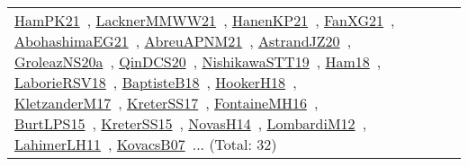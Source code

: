 {\begin{longtable}{lp{3cm}>{\raggedright\arraybackslash}p{6cm}>{\raggedright\arraybackslash}p{6cm}>{\raggedright\arraybackslash}p{8cm}}
\href{works/HamPK21.pdf}{HamPK21}~\cite{HamPK21}, \href{works/LacknerMMWW21.pdf}{LacknerMMWW21}~\cite{LacknerMMWW21}, \href{works/HanenKP21.pdf}{HanenKP21}~\cite{HanenKP21}, \href{works/FanXG21.pdf}{FanXG21}~\cite{FanXG21}, \href{works/AbohashimaEG21.pdf}{AbohashimaEG21}~\cite{AbohashimaEG21}, \href{works/AbreuAPNM21.pdf}{AbreuAPNM21}~\cite{AbreuAPNM21}, \href{works/AstrandJZ20.pdf}{AstrandJZ20}~\cite{AstrandJZ20}, \href{works/GroleazNS20a.pdf}{GroleazNS20a}~\cite{GroleazNS20a}, \href{works/QinDCS20.pdf}{QinDCS20}~\cite{QinDCS20}, \href{works/NishikawaSTT19.pdf}{NishikawaSTT19}~\cite{NishikawaSTT19}, \href{works/Ham18.pdf}{Ham18}~\cite{Ham18}, \href{works/LaborieRSV18.pdf}{LaborieRSV18}~\cite{LaborieRSV18}, \href{works/BaptisteB18.pdf}{BaptisteB18}~\cite{BaptisteB18}, \href{works/HookerH18.pdf}{HookerH18}~\cite{HookerH18}, \href{works/KletzanderM17.pdf}{KletzanderM17}~\cite{KletzanderM17}, \href{works/KreterSS17.pdf}{KreterSS17}~\cite{KreterSS17}, \href{works/FontaineMH16.pdf}{FontaineMH16}~\cite{FontaineMH16}, \href{works/BurtLPS15.pdf}{BurtLPS15}~\cite{BurtLPS15}, \href{works/KreterSS15.pdf}{KreterSS15}~\cite{KreterSS15}, \href{works/NovasH14.pdf}{NovasH14}~\cite{NovasH14}, \href{works/LombardiM12.pdf}{LombardiM12}~\cite{LombardiM12}, \href{works/LahimerLH11.pdf}{LahimerLH11}~\cite{LahimerLH11}, \href{works/KovacsB07.pdf}{KovacsB07}~\cite{KovacsB07}... (Total: 32)\\

\end{longtable}}
